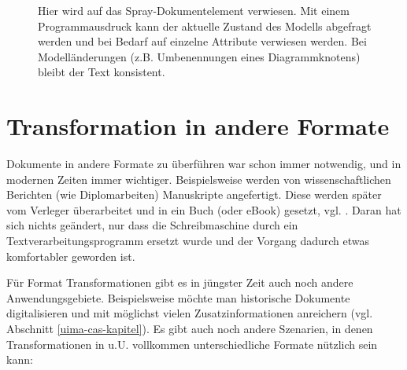  
\begin{figure}[h!]
\centering
\advance\leftskip-2.5cm
\caption[Spray-Dokumentelement verweisen]{ Hier wird auf das Spray-Dokumentelement verwiesen. Mit einem Programmausdruck kann der aktuelle Zustand des Modells abgefragt werden und bei Bedarf auf einzelne Attribute verwiesen werden. Bei Modelländerungen (z.B. Umbenennungen eines Diagrammknotens) bleibt der Text konsistent. }\label{sprayreferenzieren}
\end{figure}
 
\section{Transformation in andere Formate}\label{transformation}
 
Dokumente in andere Formate zu überführen war schon immer notwendig, und in modernen Zeiten immer wichtiger. Beispielsweise werden von wissenschaftlichen Berichten (wie Diplomarbeiten) Manuskripte angefertigt. Diese werden später vom Verleger überarbeitet und in ein Buch (oder eBook) gesetzt, vgl. \citep{DIN1422-1}. Daran hat sich nichts geändert, nur dass die Schreibmaschine durch ein Textverarbeitungsprogramm ersetzt wurde und der Vorgang dadurch etwas komfortabler geworden ist.

 
Für Format Transformationen gibt es in jüngster Zeit auch noch andere Anwendungsgebiete. Beispielsweise möchte man historische Dokumente digitalisieren und mit möglichst vielen Zusatzinformationen anreichern (vgl. Abschnitt \ref{uima-cas-kapitel}). Es gibt auch noch andere Szenarien, in denen Transformationen in u.U. vollkommen unterschiedliche Formate nützlich sein kann:


